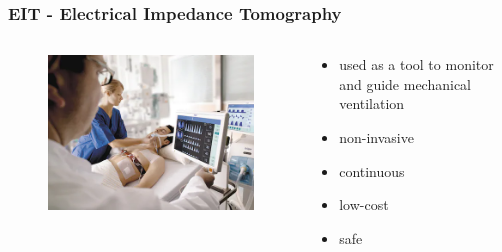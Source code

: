 \documentclass[10pt,    %
    english,            %
    xcolor=table,       %
    envcountsect,        %
    aspectratio=1610
]{beamer}
\begin{document}
\begin{frame}
	\frametitle{EIT - Electrical Impedance Tomography}    
	\begin{columns}[c]
		\begin{column}{0.5\textwidth}
			\begin{figure}
				\includegraphics[width=\textwidth]{draeger_system.png}
			\end{figure}
		\end{column}
		\begin{column}{0.5\textwidth}
			\begin{itemize}
				\item used as a tool to monitor and guide mechanical ventilation  
				\item non-invasive 
				\item continuous 
				\item low-cost
				\item safe 
			\end{itemize}
		\end{column}
	\end{columns}
\end{frame}
\end{document}
